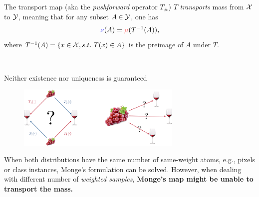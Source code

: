 \documentclass[pdf,aspectratio=169,10pt]{beamer}
\begin{document}
\begin{frame}{The transport map (aka the \emph{pushforward} operator $T_\#$)}
    $T$ \emph{transports} mass from ${\mathcal{X}}$ to ${\mathcal{Y}}$, meaning that for any subset $A\in{\mathcal{Y}}$, one has 
    \begin{equation}
        \eb{\nu}(A) = \er{\mu}(T^{-1}(A)),
    \end{equation}
    where $T^{-1}(A)=\{x\in{\mathcal{X}}, s.t.\ T(x)\in A \}$ is the preimage of $A$ under $T$.
\vspace{2em}

\\
\end{frame}






\begin{frame}{ Neither existence nor uniqueness is guaranteed}
        \begin{figure}
        \includegraphics[width=0.7\textwidth]{../img/existence_uniqueness.pdf}
    \end{figure}
    \vspace{1em}
 When both distributions have the same number of same-weight atoms, e.g., pixels or class instances, Monge's formulation can be solved. However, when dealing with different number of \emph{weighted samples}, \textbf{Monge's map might be unable to transport the mass.}
\end{frame}
\end{document}
